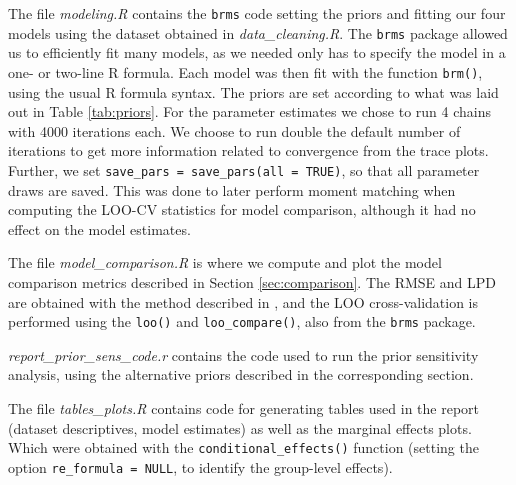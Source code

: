 \documentclass[12pt]{article}
\newcommand{\red}[1]{\textcolor{red}{#1}}
\newcommand{\blue}[1]{\textcolor{blue}{#1}}
\begin{document}
The file \textit{modeling.R} contains the \verb|brms| code setting the priors and fitting our four models using the dataset obtained in \textit{data\_cleaning.R}.
The \verb|brms| package allowed us to efficiently fit many models, as we needed only has to specify the model in a one- or two-line R formula. Each model was then fit with the function \verb|brm()|, using the usual R formula syntax. 
The priors are set according to what was laid out in Table \ref{tab:priors}.
For the parameter estimates we chose to run 4 chains with 4000 iterations each. We choose to run double the default number of iterations to get more information related to convergence from the trace plots. Further, we set \texttt{save\_pars = save\_pars(all = TRUE)}, so that all parameter draws are saved. This was done to later perform moment matching when computing the LOO-CV statistics for model comparison, although it had no effect on the model estimates.

The file \textit{model\_comparison.R} is where we compute and plot the model comparison metrics described in Section \ref{sec:comparison}. The RMSE and LPD are obtained with the method described in \cite{brmsbook}, and the LOO cross-validation is performed using the \verb|loo()| and \verb|loo_compare()|, also from the \verb|brms| package.

\textit{report\_prior\_sens\_code.r} contains the code used to run the prior sensitivity analysis, using the alternative priors described in the corresponding section.

The file \textit{tables\_plots.R} contains code for generating tables used in the report (dataset descriptives, model estimates) as well as the marginal effects plots. Which were obtained with the \verb|conditional_effects()| function (setting the option \texttt{re\_formula = NULL}, to identify the group-level effects).






\end{document}
